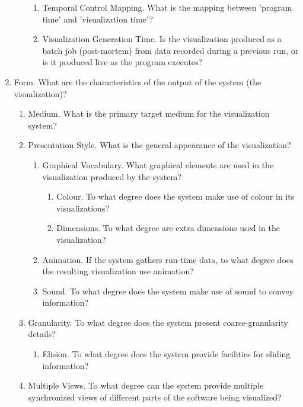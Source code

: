 \begin{enumerate}
\begin{enumerate}
    \begin{enumerate}
      \item Temporal Control Mapping. What is the mapping between 'program time'
      and 'visualization time'?
      \item Visualization Generation Time. Is the visualization produced as a
      batch job (post-mortem) from data recorded during a previous run, or is it
      produced live as the program executes?
    \end{enumerate}
  \end{enumerate}
  \item Form. What are the characteristics of the output of the system (the
  visualization)?
  \begin{enumerate}
    \item Medium. What is the primary target medium for the visualization
    system?
    \item Presentation Style. What is the general appearance of the
    visualization?
    \begin{enumerate}
      \item Graphical Vocabulary. What graphical elements are used in the
      visualization produced by the system?
      \begin{enumerate}
        \item Colour. To what degree does the system make use of colour in its
        visualizations?
        \item Dimensions. To what degree are extra dimensions used in the
        visualization?
      \end{enumerate}
      \item Animation. If the system gathers run-time data, to what degree does
      the resulting visualization use animation?
      \item Sound. To what degree does the system make use of sound to convey
      information?
    \end{enumerate}
    \item Granularity. To what degree does the system present coarse-granularity
    details?
    \begin{enumerate}
      \item Elision. To what degree does the system provide facilities for
      eliding information?
    \end{enumerate}
    \item Multiple Views. To what degree can the system provide multiple
    synchronized views of different parts of the software being visualized?

\end{enumerate}
\end{enumerate}
